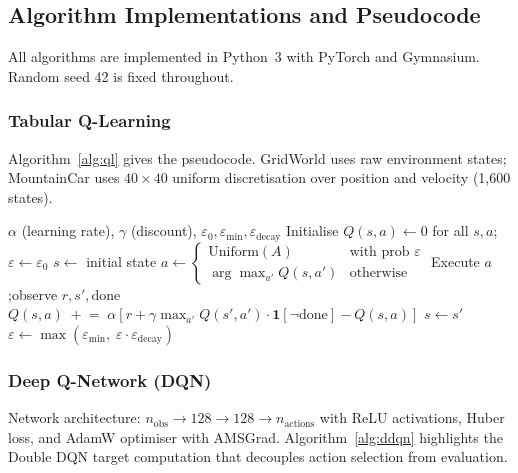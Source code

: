 \documentclass[a4paper,12pt]{article}
\begin{document}
\subsection{Algorithm Implementations and Pseudocode}

All algorithms are implemented in Python~3 with PyTorch and Gymnasium. Random seed 42 is fixed throughout.

\subsubsection{Tabular Q-Learning}

Algorithm~\ref{alg:ql} gives the pseudocode. GridWorld uses raw environment states; MountainCar uses $40\times40$ uniform discretisation over position and velocity (1,600 states).

\begin{algorithm}[H]
\caption{Tabular Q-Learning}
\label{alg:ql}
\begin{algorithmic}[1]
\Input $\alpha$ (learning rate), $\gamma$ (discount), $\varepsilon_0, \varepsilon_{\min}, \varepsilon_{\text{decay}}$
\State Initialise $Q(s,a) \leftarrow 0$ for all $s, a$;\enspace $\varepsilon \leftarrow \varepsilon_0$
  \State $s \leftarrow$ initial state
  \Repeat
    \State $a \leftarrow \begin{cases} \text{Uniform}(A) & \text{with prob } \varepsilon \\ \arg\max_{a'} Q(s,a') & \text{otherwise} \end{cases}$
    \State Execute $a$;\enspace observe $r, s', \text{done}$
    \State $Q(s,a) \;\mathrel{+}=\; \alpha\!\left[r + \gamma \max_{a'} Q(s',a')\cdot\mathbf{1}[\neg\text{done}] - Q(s,a)\right]$
    \State $s \leftarrow s'$
  \State $\varepsilon \leftarrow \max\!\left(\varepsilon_{\min},\; \varepsilon\cdot\varepsilon_{\text{decay}}\right)$
\EndFor
\end{algorithmic}
\end{algorithm}

\subsubsection{Deep Q-Network (DQN)}

Network architecture: $n_{\text{obs}} \to 128 \to 128 \to n_{\text{actions}}$ with ReLU activations, Huber loss, and AdamW optimiser with AMSGrad. Algorithm~\ref{alg:ddqn} highlights the Double DQN target computation that decouples action selection from evaluation.
\end{document}
